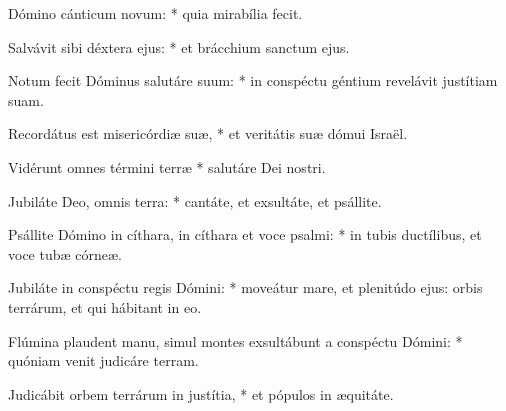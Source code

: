 \begin{psalmus}

     Dómino cánticum novum: * quia mirabília fecit.

    Salvávit sibi déxtera ejus: * et brácchium sanctum ejus.

    Notum fecit Dóminus salutáre suum: * in conspéctu géntium revelávit justítiam suam.

    Recordátus est misericórdiæ suæ, * et veritátis suæ dómui Israël.

    Vidérunt omnes términi terræ * salutáre Dei nostri.

    Jubiláte Deo, omnis terra: * cantáte, et exsultáte, et psállite.

    Psállite Dómino in cíthara, in cíthara et voce psalmi: * in tubis ductílibus, et voce tubæ córneæ.

    Jubiláte in conspéctu regis Dómini: * moveátur mare, et plenitúdo ejus: orbis terrárum, et qui hábitant in eo.

    Flúmina plaudent manu, simul montes exsultábunt a conspéctu Dómini: * quóniam venit judicáre terram.

    Judicábit orbem terrárum in justítia, * et pópulos in æquitáte.

\end{psalmus}
